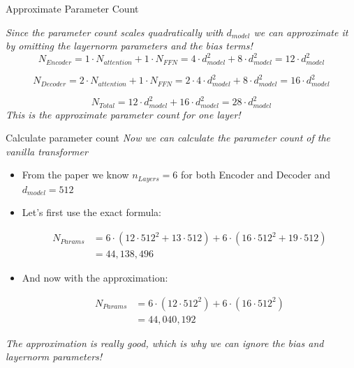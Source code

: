 \documentclass[11pt,compress,t,notes=noshow, xcolor=table]{beamer}
\begin{document}
\begin{frame}{Approximate Parameter Count}

\textit{Since the parameter count scales quadratically with $d_{model}$ we can approximate it by omitting the layernorm parameters and the bias terms!} 
$$N_{Encoder} = 1\cdot N_{attention} + 1\cdot N_{FFN} = 4\cdot d_{model}^2 + 8\cdot d_{model}^2 = 12 \cdot d_{model}^2$$

$$N_{Decoder} = 2\cdot N_{attention} + 1\cdot N_{FFN} = 2\cdot 4\cdot d_{model}^2 + 8\cdot d_{model}^2 = 16\cdot d_{model}^2$$

$$N_{Total} = 12\cdot d_{model}^2 + 16\cdot d_{model}^2 = 28\cdot d_{model}^2$$
\vfill
\textit{This is the approximate parameter count for one layer!}

\end{frame}


\begin{frame}{Calculate parameter count}
\textit{Now we can calculate the parameter count of the vanilla transformer}

\begin{itemize}
    \item From the paper we know $n_{Layers} = 6$ for both Encoder and Decoder and $d_{model} = 512$
    \item Let's first use the exact formula:

\begin{align*}
N_{Params} &= 6\cdot(12\cdot 512^2 + 13\cdot 512) + 6\cdot(16\cdot 512^2 + 19\cdot 512) \\
&= 44,138,496
\end{align*}

    \item And now with the approximation:

\begin{align*}
N_{Params} &= 6\cdot(12\cdot 512^2) + 6\cdot(16\cdot 512^2) \\
&= 44,040,192
\end{align*}

\end{itemize}

\textit{The approximation is really good, which is why we can ignore the bias and layernorm parameters!}
    
\end{frame}

\end{document}
